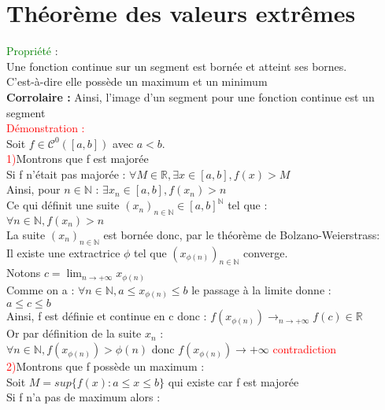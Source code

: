 \documentclass{article}
\begin{document}
\section{Théorème des valeurs extrêmes}
\textcolor{green}{Propriété} : \\ 
Une fonction continue sur un segment est bornée et atteint ses bornes. \\ 
C'est-à-dire elle possède un maximum et un minimum \\ 
{\bf Corrolaire :} Ainsi, l'image d'un segment pour une fonction continue est un segment \\ 
\textcolor{red}{Démonstration :} \\ 
Soit $f \in \mathcal{C}^0([a,b])$ avec $a<b$. \\ 
\textcolor{red}{1)}Montrons que f est majorée \\ 
Si f n'était pas majorée : $\forall M \in \mathbb{R}, \exists x \in [a,b], f(x)>M$ \\ 
Ainsi, pour $n \in \mathbb{N} $ : $\exists x_n \in [a,b], f(x_n)>n$ \\ 
Ce qui définit une suite $(x_n)_{n\in \mathbb{N}} \in [a,b]^{\mathbb{N}}$ tel que : \\ 
$\forall n \in \mathbb{N},f(x_n)>n$ \\ 
La suite $(x_n)_{n \in \mathbb{N}}$ est bornée donc, par le théorème de Bolzano-Weierstrass: \\ 
Il existe une extractrice $\phi$ tel que $(x_{\phi(n)})_{n \in \mathbb{N}}$ converge. \\ 
Notons $c= \lim_{n\rightarrow + \infty} x_{\phi(n)} $ \\ 
Comme on a : $\forall n \in \mathbb{N}, a \leq x_{\phi(n)} \leq b$ le passage à la limite donne : \\ 
$a \leq c \leq b$ \\
Ainsi, f est définie et continue en c donc : $f(x_{\phi(n)}) \rightarrow_{n\rightarrow + \infty}f(c) \in \mathbb{R}$ \\ 
Or par définition de la suite $x_n$ : \\ 
$\forall n \in \mathbb{N},f(x_{\phi(n)})> \phi(n)$
donc $f(x_{\phi(n)}) \rightarrow + \infty$ \textcolor{red}{contradiction} \\ 
\textcolor{red}{2)}Montrons que f possède un maximum : \\ 
Soit $M=sup\lbrace f(x): a \leq x \leq b \rbrace$ qui existe car f est majorée \\ 
Si f n'a pas de maximum alors : \\ 
\end{document}
